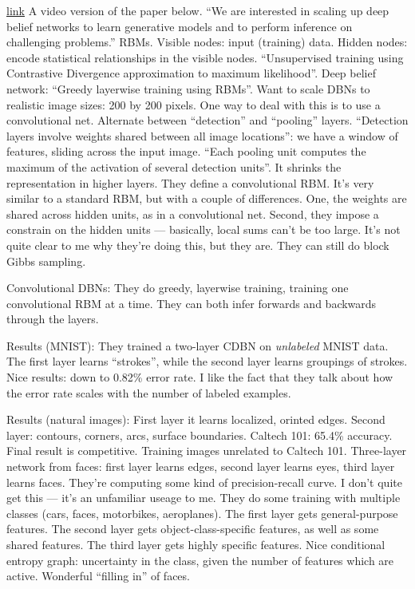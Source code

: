 \documentclass[12pt]{report}
\newcommand{\link}[2]{\href{#1}{#2}}
\begin{document}
\link{http://videolectures.net/icml09\_lee\_cdb/}{link} A video
version of the paper below.  ``We are interested in scaling up deep
belief networks to learn generative models and to perform inference on
challenging problems.''  RBMs.  Visible nodes: input (training) data.
Hidden nodes: encode statistical relationships in the visible nodes.
``Unsupervised training using Contrastive Divergence approximation to
maximum likelihood''.  Deep belief network: ``Greedy layerwise
training using RBMs''.  Want to scale DBNs to realistic image sizes:
200 by 200 pixels.  One way to deal with this is to use a
convolutional net.  Alternate between ``detection'' and ``pooling''
layers.  ``Detection layers involve weights shared between all image
locations'': we have a window of features, sliding across the input
image.  ``Each pooling unit computes the maximum of the activation of
several detection units''.  It shrinks the representation in higher
layers.  They define a convolutional RBM.  It's very similar to a
standard RBM, but with a couple of differences.  One, the weights are
shared across hidden units, as in a convolutional net.  Second, they
impose a constrain on the hidden units --- basically, local sums can't
be too large.  It's not quite clear to me why they're doing this, but
they are.  They can still do block Gibbs sampling.  

Convolutional DBNs: They do greedy, layerwise training, training one
convolutional RBM at a time.  They can both infer forwards and
backwards through the layers.

Results (MNIST): They trained a two-layer CDBN on \emph{unlabeled}
MNIST data.  The first layer learns ``strokes'', while the second
layer learns groupings of strokes.  Nice results: down to 0.82\% error
rate.  I like the fact that they talk about how the error rate scales
with the number of labeled examples.

Results (natural images): First layer it learns localized, orinted
edges.  Second layer: contours, corners, arcs, surface boundaries.
Caltech 101: 65.4\% accuracy.  Final result is competitive.  Training
images unrelated to Caltech 101.  Three-layer network from faces:
first layer learns edges, second layer learns eyes, third layer learns
faces.  They're computing some kind of precision-recall curve.  I
don't quite get this --- it's an unfamiliar useage to me.  They do
some training with multiple classes (cars, faces, motorbikes,
aeroplanes).  The first layer gets general-purpose features.  The
second layer gets object-class-specific features, as well as some
shared features.  The third layer gets highly specific features.  Nice
conditional entropy graph: uncertainty in the class, given the number
of features which are active.  Wonderful ``filling in'' of faces.
\end{document}
